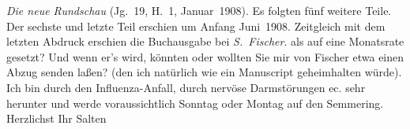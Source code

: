 \begin{ledgroupsized}[t]{13cm}
{{{                     \emph{Die neue Rundschau} (Jg. 19, H. 1,
                        Januar 1908). Es folgten fünf weitere Teile. Der sechste und letzte Teil erschien um
                  Anfang Juni 1908. Zeitgleich mit dem letzten Abdruck
                  erschien die Buchausgabe bei \emph{S. Fischer}.}}}\label{K_L03509-1h} als auf eine Monatsrate gesetzt? Und wenn er’s wird,
               könnten oder wollten Sie mir von Fischer etwa
               einen Abzug senden laßen? (den ich natürlich wie ein Manuscript geheimhalten würde).
               Ich bin durch den Influenza-Anfall, durch nervöse Darmstörungen ec. sehr herunter und
               werde voraussichtlich Sonntag oder Montag auf den Semmering.\pend
           \pstart Herzlichst Ihr \spacefill\mbox{Salten}\pend{}
         
         \endnumbering{}\end{ledgroupsized}  \newcommand{\dateiname}{L03509}\newcommand{\titel}{Felix Salten an Arthur Schnitzler, 16. 1. 1908}\newcommand{\editorInnen}{Martin Anton Müller und Laura Untner}
      